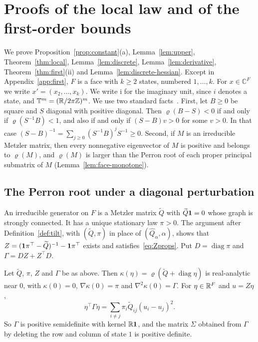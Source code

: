 \section{Proofs of the local law and of the first-order bounds}\label{app:torus}

We prove Proposition~\ref{prop:constant}(a),
Lemma~\ref{lem:upper}, Theorem~\ref{thm:local}, Lemma~\ref{lem:discrete},
Lemma~\ref{lem:derivative}, Theorem~\ref{thm:first}(ii) and
Lemma~\ref{lem:discrete-hessian}. Except in
Appendix~\ref{app:first}, $F$ is a face with $k\ge2$ states, numbered
$1,\dots,k$. For $x\in\mathbb C^F$ we write $x'=(x_2,\dots,x_k)$. We write
$\mathrm i$ for the imaginary unit, since $i$ denotes a state, and
$\mathbb T^m=(\mathbb{R}/2\pi\mathbb{Z})^m$. We use two standard facts~\cite{bermanplemmons1994}.
First, let $B\ge0$ be square and $S$ diagonal with positive diagonal. Then
$\varrho(B-S)<0$ if and only if $\varrho(S^{-1}B)<1$, and also if and only if
$(S-B)v>0$ for some $v>0$. In that case
$(S-B)^{-1}=\sum_{j\ge0}(S^{-1}B)^jS^{-1}\ge0$. Second, if $M$ is an
irreducible Metzler matrix, then every nonnegative eigenvector of $M$ is positive
and belongs to $\varrho(M)$, and $\varrho(M)$ is larger than the Perron root of each
proper principal submatrix of $M$ (Lemma~\ref{lem:face-monotone}).

\subsection{The Perron root under a diagonal perturbation}

An irreducible generator on $F$ is a Metzler matrix $\widetilde Q$ with $\widetilde Q\mathbf{1}=0$ whose
graph is strongly connected. It has a unique stationary law $\pi>0$. The
argument after Definition~\ref{def:tilt}, with $(\widetilde Q,\pi)$ in place of
$(\widehat Q_\alpha,\alpha)$, shows that
$Z=(\mathbf{1}\pi^\top-\widetilde Q)^{-1}-\mathbf{1}\pi^\top$ exists and
satisfies~\eqref{eq:Zprops}. Put $D=\operatorname{diag}\pi$ and
$\Gamma=DZ+Z^\top D$.

\begin{lemma}\label{lem:perron}
Let $\widetilde Q$, $\pi$, $Z$ and $\Gamma$ be as above. Then
$\kappa(\eta)=\varrho(\widetilde Q+\operatorname{diag}\eta)$ is real-analytic near $0$,
with $\kappa(0)=0$, $\nabla\kappa(0)=\pi$ and $\nabla^2\kappa(0)=\Gamma$. For
$\eta\in\mathbb{R}^F$ and $u=Z\eta$,
\begin{equation}\label{eq:A-dirichlet}
\eta^\top\Gamma\eta=\sum_{i\ne j}\pi_i\widetilde Q_{ij}(u_i-u_j)^2 .
\end{equation}
So $\Gamma$ is positive semidefinite with kernel $\mathbb{R}\mathbf{1}$, and the matrix $\Sigma$
obtained from $\Gamma$ by deleting the row and column of state $1$ is positive
definite.
\end{lemma}

